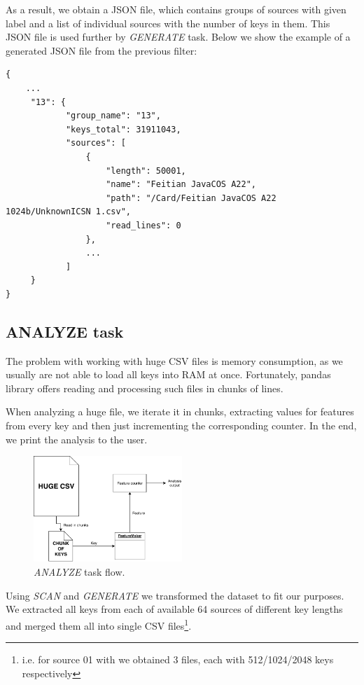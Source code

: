 \noindent
As a result, we obtain a JSON file, which contains groups of sources with given label and a list of individual sources with the number of keys in them. This JSON file is used further by \textit{GENERATE} task. Below we show the example of a generated JSON file from the previous filter:

\begin{verbatim}
{
    ...
     "13": {
            "group_name": "13",
            "keys_total": 31911043,
            "sources": [
                {
                    "length": 50001,
                    "name": "Feitian JavaCOS A22",
                    "path": "/Card/Feitian JavaCOS A22 1024b/UnknownICSN 1.csv",
                    "read_lines": 0
                },
                ...
            ]
     }
}

\end{verbatim}

\subsection{ANALYZE task}

The problem with working with huge CSV files is memory consumption, as we usually are not able to load all keys into RAM at once. Fortunately, pandas\cite{pandas} library offers reading and processing such files in chunks of lines. 

When analyzing a huge file, we iterate it in chunks, extracting values for features from every key and then just incrementing the corresponding counter. In the end, we print the analysis to the user.

\begin{figure}[h]

\centering
\includegraphics[width=0.5\textwidth]{tex/images/analyze_task}
\caption{\textit{ANALYZE} task flow.}

\end{figure}

Using \textit{SCAN} and \textit{GENERATE} we transformed the dataset to fit our purposes. We extracted all keys from each of available 64 sources of different key lengths and merged them all into single CSV files\footnote{i.e. for source 01 with we obtained 3 files, each with 512/1024/2048 keys respectively}. 

